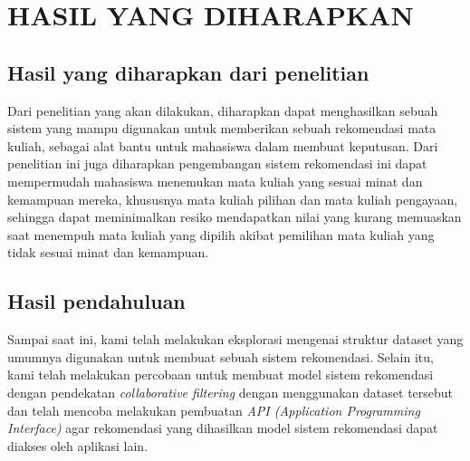 \chapter{HASIL YANG DIHARAPKAN}

\section{Hasil yang diharapkan dari penelitian}
Dari penelitian yang akan dilakukan, diharapkan dapat menghasilkan sebuah sistem yang mampu digunakan untuk
memberikan sebuah rekomendasi mata kuliah, sebagai alat bantu untuk mahasiswa dalam membuat keputusan. Dari penelitian ini juga
diharapkan pengembangan sistem rekomendasi ini dapat mempermudah mahasiswa menemukan mata kuliah yang sesuai minat dan kemampuan mereka,
khususnya mata kuliah pilihan dan mata kuliah pengayaan, sehingga dapat meminimalkan resiko mendapatkan nilai yang kurang memuaskan saat
menempuh mata kuliah yang dipilih akibat pemilihan mata kuliah yang tidak sesuai minat dan kemampuan.

\section{Hasil pendahuluan}
Sampai saat ini, kami telah melakukan eksplorasi mengenai struktur dataset yang umumnya digunakan untuk membuat sebuah sistem rekomendasi.
Selain itu, kami telah melakukan percobaan untuk membuat model sistem rekomendasi dengan pendekatan \emph{collaborative filtering}
dengan menggunakan dataset tersebut dan telah mencoba melakukan pembuatan \emph{API (Application Programming Interface)} agar rekomendasi yang
dihasilkan model sistem rekomendasi dapat diakses oleh aplikasi lain.

\newpage


